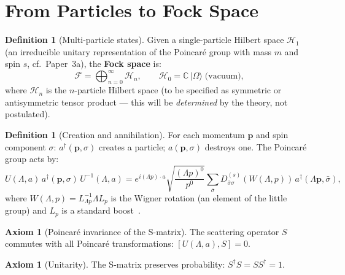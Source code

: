 \documentclass[12pt]{article}
\theoremstyle{plain}
\theoremstyle{definition}
\newtheorem{definition}[theorem]{Definition}
\newtheorem{axiom}[theorem]{Axiom}
\theoremstyle{remark}
\begin{document}
\section{From Particles to Fock Space}
\label{sec:fock}

\begin{definition}[Multi-particle states]\label{def:fock}
Given a single-particle Hilbert space $\mathcal{H}_1$ (an irreducible unitary representation of the Poincar\'e group with mass $m$ and spin $s$, cf.\ Paper~3a), the \textbf{Fock space} is:
\begin{equation}
\mathcal{F} = \bigoplus_{n=0}^{\infty} \mathcal{H}_n, \qquad \mathcal{H}_0 = \mathbb{C}\,|\Omega\rangle \;\text{(vacuum)},
\end{equation}
where $\mathcal{H}_n$ is the $n$-particle Hilbert space (to be specified as symmetric or antisymmetric tensor product --- this will be \emph{determined} by the theory, not postulated).
\end{definition}

\begin{definition}[Creation and annihilation]\label{def:creation}
For each momentum $\mathbf{p}$ and spin component $\sigma$: $a^\dagger(\mathbf{p}, \sigma)$ creates a particle; $a(\mathbf{p}, \sigma)$ destroys one. The Poincar\'e group acts by:
\begin{equation}\label{eq:poincare-on-a}
U(\Lambda, a)\,a^\dagger(\mathbf{p}, \sigma)\,U^{-1}(\Lambda, a) = e^{i(\Lambda p)\cdot a}\sqrt{\frac{(\Lambda p)^0}{p^0}} \sum_{\bar\sigma} D^{(s)}_{\bar\sigma\sigma}(W(\Lambda, p))\,a^\dagger(\Lambda\mathbf{p}, \bar\sigma),
\end{equation}
where $W(\Lambda, p) = L^{-1}_{\Lambda p}\Lambda L_p$ is the Wigner rotation (an element of the little group) and $L_p$ is a standard boost~\cite{weinberg1995}.
\end{definition}

\begin{axiom}[Poincar\'e invariance of the S-matrix]\label{ax:QF1}
The scattering operator $S$ commutes with all Poincar\'e transformations: $[U(\Lambda, a), S] = 0$.
\end{axiom}

\begin{axiom}[Unitarity]\label{ax:QF2}
The S-matrix preserves probability: $S^\dagger S = SS^\dagger = 1$.
\end{axiom}


\end{document}
